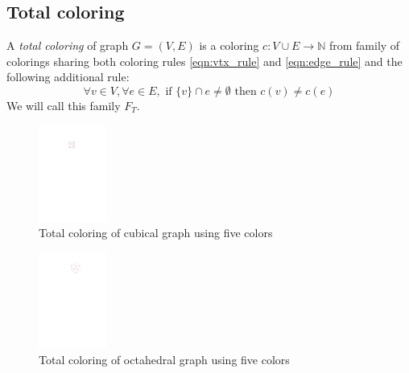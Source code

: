 \subsection{Total coloring}

\begin{definition}
    A \textit{total coloring} of graph $G=(V,E)$ is a coloring $c: V \cup E \rightarrow \mathbb{N}$ from family of colorings sharing both coloring rules \ref{eqn:vtx_rule} and \ref{eqn:edge_rule} and the following additional rule: 
    \begin{equation}\label{eqn:tot_rule}
    \forall v \in V,  \forall e \in E, \text{ if } \{v\} \cap e \neq \emptyset \text{ then } c(v) \neq c(e) \tag{$R_T$}
    \end{equation}
    We will call this family $F_T$.
\end{definition}

\begin{figure}[H]
    \centering
    \includegraphics[width=0.2\textwidth]{../Resources/Figs/cubical_tot_colr.pdf}
    \caption{Total coloring of cubical graph using five colors}
    \label{fig:cubical_tot_coloring}
\end{figure}

\begin{figure}[H]
    \centering
    \includegraphics[width=0.2\textwidth]{../Resources/Figs/octahedral_tot_colr.pdf}
    \caption{Total coloring of octahedral graph using five colors}
    \label{fig:octahedral_tot_coloring}
\end{figure}


